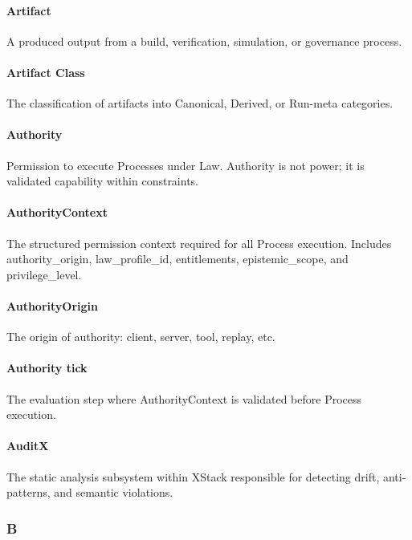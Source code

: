 \documentclass[9pt,a4paper,openany]{book}
\begin{document}
\paragraph{Artifact}
A produced output from a build, verification, simulation, or governance process.\allowbreak{}


\paragraph{Artifact Class}
The classification of artifacts into Canonical, Derived, or Run-\allowbreak{}meta categories.\allowbreak{}


\paragraph{Authority}
Permission to execute Processes under Law.\allowbreak{} Authority is not power; it is validated capability within constraints.\allowbreak{}


\paragraph{AuthorityContext}
The structured permission context required for all Process execution.\allowbreak{} Includes authority\_\allowbreak{}origin, law\_\allowbreak{}profile\_\allowbreak{}id, entitlements, epistemic\_\allowbreak{}scope, and privilege\_\allowbreak{}level.\allowbreak{}


\paragraph{AuthorityOrigin}
The origin of authority: client, server, tool, replay, etc.\allowbreak{}


\paragraph{Authority tick}
The evaluation step where AuthorityContext is validated before Process execution.\allowbreak{}


\paragraph{AuditX}
The static analysis subsystem within XStack responsible for detecting drift, anti-\allowbreak{}patterns, and semantic violations.\allowbreak{}


\subsubsection{B}
\end{document}
